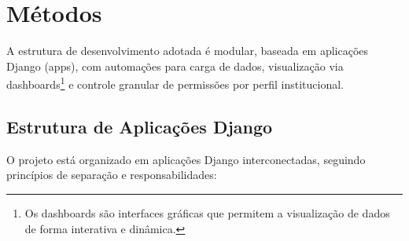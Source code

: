 \section{Métodos}

A estrutura de desenvolvimento adotada é modular, baseada em aplicações Django (apps), com automações para carga de dados, visualização via dashboards\footnote{Os dashboards são interfaces gráficas que permitem a visualização de dados de forma interativa e dinâmica.} e controle granular de permissões por perfil institucional.

\subsection{Estrutura de Aplicações Django}
\par O projeto está organizado em aplicações Django interconectadas, seguindo princípios de separação e responsabilidades:


